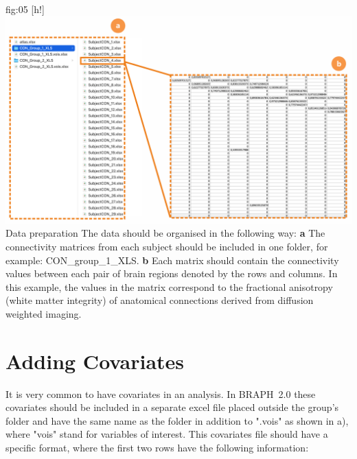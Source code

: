 \documentclass[justified]{tufte-handout}
\begin{document}
	{fig:05}
	{
	[h!]
	\includegraphics{fig05.png}
	}
	{Data preparation}
	{
	The data should be organised in the following way:
	{\bf a} The connectivity matrices from each subject should be included in one folder, for example: CON\_group\_1\_XLS. 
	{\bf b} Each matrix should contain the connectivity values between each pair of brain regions denoted by the rows and columns. In this 	example, the values in the matrix correspond to the fractional anisotropy (white matter integrity) of anatomical connections derived from 	diffusion weighted imaging.
	} 

\section{Adding Covariates}

It is very common to have covariates in an analysis. In BRAPH~2.0 these covariates should be included in a separate excel file placed outside the group's folder and have the same name as the folder in addition to ".vois" as shown in a), where "vois" stand for variables of interest. This covariates file should have a specific format, where the first two rows have the following information:
\end{document}
